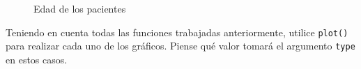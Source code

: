 \documentclass{prob}
\begin{document}
\begin{problema}
\begin{parte}
\begin{figure}[!ht]
    \centering
    \caption{Edad de los pacientes}
    \label{fig:hist23}
\end{figure}

	Teniendo en cuenta todas las funciones trabajadas anteriormente, utilice \texttt{plot()} para realizar cada uno de los gráficos. Piense qué valor tomará el argumento \texttt{type} en estos casos.

	\end{parte}
	
	\end{problema}
\end{document}
